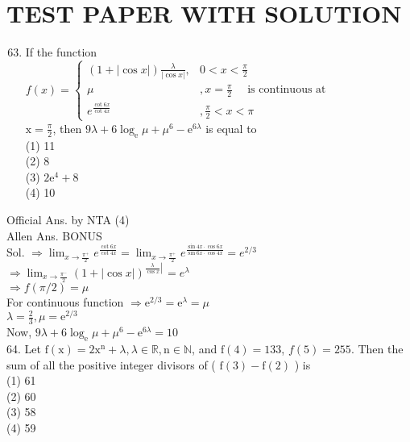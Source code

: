 \documentclass[10pt]{article}
\begin{document}
\section*{TEST PAPER WITH SOLUTION}
\begin{enumerate}
  \setcounter{enumi}{62}
  \item If the function\\
\(f(x)=\left\{\begin{array}{cl}(1+|\cos x|) \frac{\lambda}{|\cos x|}, & 0<x<\frac{\pi}{2} \\ \mu \quad & , x=\frac{\pi}{2} \quad \text { is continuous at } \\ e^{\frac{\cot 6 x}{\cot 4 x}} & , \frac{\pi}{2}<x<\pi\end{array}\right.\)\\
\(\mathrm{x}=\frac{\pi}{2}\), then \(9 \lambda+6 \log _{\mathrm{e}} \mu+\mu^{6}-\mathrm{e}^{6 \lambda}\) is equal to\\
(1) 11\\
(2) 8\\
(3) \(2 \mathrm{e}^{4}+8\)\\
(4) 10
\end{enumerate}

Official Ans. by NTA (4)\\
Allen Ans. BONUS\\
Sol. \(\Rightarrow \lim _{x \rightarrow \frac{\pi^{+}}{2}} e^{\frac{\cot 6 x}{\cot 4 x}}=\lim _{x \rightarrow \frac{\pi^{+}}{2}} e^{\frac{\sin 4 x \cdot \cos 6 x}{\sin 6 x \cdot \cos 4 x}}=e^{2 / 3}\)\\
\(\Rightarrow \lim _{x \rightarrow \frac{\pi^{-}}{2}}(1+|\cos x|)^{\left.\frac{\lambda}{\cos x} \right\rvert\,}=e^{\lambda}\)\\
\(\Rightarrow f(\pi / 2)=\mu\)\\
For continuous function \(\Rightarrow \mathrm{e}^{2 / 3}=\mathrm{e}^{\lambda}=\mu\)\\
\(\lambda=\frac{2}{3}, \mu=\mathrm{e}^{2 / 3}\)\\
Now, \(9 \lambda+6 \log _{\mathrm{e}} \mu+\mu^{6}-\mathrm{e}^{6 \lambda}=10\)\\
64. Let \(\mathrm{f}(\mathrm{x})=2 \mathrm{x}^{\mathrm{n}}+\lambda, \lambda \in \mathbb{R}, \mathrm{n} \in \mathbb{N}\), and \(\mathrm{f}(4)=133\), \(f(5)=255\). Then the sum of all the positive integer divisors of ( \(\mathrm{f}(3)-\mathrm{f}(2)\) ) is\\
(1) 61\\
(2) 60\\
(3) 58\\
(4) 59
\end{document}
